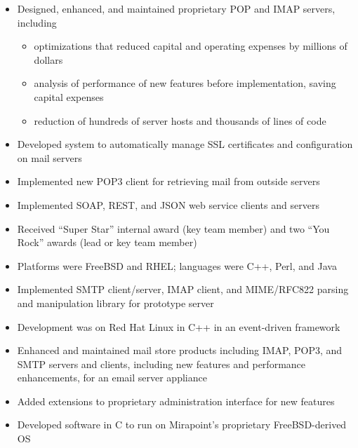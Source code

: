\documentclass[letterpaper,11pt,twoside]{article}
\begin{document}
\vspace{-14pt}
\begin{itemize}
\item Designed, enhanced, and maintained proprietary POP and IMAP
  servers, including
  \begin{itemize}
  \item optimizations that reduced capital and operating expenses
    by millions of dollars
  \item analysis of performance of new features before
    implementation, saving capital expenses
  \item reduction of hundreds of server hosts and thousands of lines of code
  \end{itemize}
\item Developed system to automatically manage SSL certificates and
  configuration on mail servers
\item Implemented new POP3 client for retrieving mail from outside servers
\item Implemented SOAP, REST, and JSON web service clients and servers
\item Received ``Super Star'' internal award (key team member) and 
  two ``You Rock'' awards (lead or key team member)
\item Platforms were FreeBSD and RHEL; languages were C++, Perl, and Java
\end{itemize}

\vspace{-14pt}
\begin{itemize}
\item Implemented SMTP client/server, IMAP client, and
  MIME/RFC822 parsing and manipulation library for prototype server
\item Development was on Red Hat Linux in C++ in an event-driven framework
\end{itemize}


\vspace{-14pt}
\begin{itemize}
\item Enhanced and maintained mail store products including
  IMAP, POP3, and SMTP servers and clients, including new features
  and performance enhancements, for an email server appliance
\item Added extensions to proprietary administration interface for new
  features
\item Developed software in C to run on Mirapoint’s proprietary
  FreeBSD-derived OS
\end{itemize}
\end{document}
